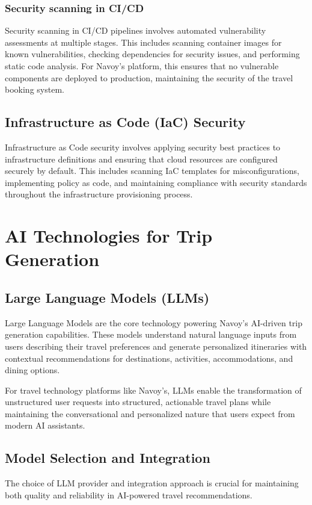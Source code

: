\subsubsection*{Security scanning in CI/CD}
Security scanning in CI/CD pipelines involves automated vulnerability assessments at multiple stages. This includes scanning container images for known vulnerabilities, checking dependencies for security issues, and performing static code analysis. For Navoy's platform, this ensures that no vulnerable components are deployed to production, maintaining the security of the travel booking system.

\subsection{Infrastructure as Code (IaC) Security}
Infrastructure as Code security involves applying security best practices to infrastructure definitions and ensuring that cloud resources are configured securely by default. This includes scanning IaC templates for misconfigurations, implementing policy as code, and maintaining compliance with security standards throughout the infrastructure provisioning process.

\section{AI Technologies for Trip Generation}

\subsection{Large Language Models (LLMs)}
Large Language Models are the core technology powering Navoy's AI-driven trip generation capabilities. These models understand natural language inputs from users describing their travel preferences and generate personalized itineraries with contextual recommendations for destinations, activities, accommodations, and dining options.

For travel technology platforms like Navoy's, LLMs enable the transformation of unstructured user requests into structured, actionable travel plans while maintaining the conversational and personalized nature that users expect from modern AI assistants.

\subsection{Model Selection and Integration}
The choice of LLM provider and integration approach is crucial for maintaining both quality and reliability in AI-powered travel recommendations.

